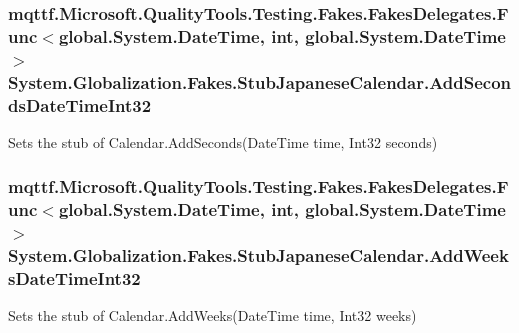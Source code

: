 \hypertarget{class_system_1_1_globalization_1_1_fakes_1_1_stub_japanese_calendar_a5edfae7addd7ca45d48e33fa68c578d3}{
\subsubsection[{Add\-Seconds\-Date\-Time\-Int32}]{\setlength{\rightskip}{0pt plus 5cm}mqttf.\-Microsoft.\-Quality\-Tools.\-Testing.\-Fakes.\-Fakes\-Delegates.\-Func$<$global.\-System.\-Date\-Time, int, global.\-System.\-Date\-Time$>$ System.\-Globalization.\-Fakes.\-Stub\-Japanese\-Calendar.\-Add\-Seconds\-Date\-Time\-Int32}}\label{class_system_1_1_globalization_1_1_fakes_1_1_stub_japanese_calendar_a5edfae7addd7ca45d48e33fa68c578d3}


Sets the stub of Calendar.\-Add\-Seconds(\-Date\-Time time, Int32 seconds)

\hypertarget{class_system_1_1_globalization_1_1_fakes_1_1_stub_japanese_calendar_a0d8e337709c0be8e71f33cdeefef5d23}{
\subsubsection[{Add\-Weeks\-Date\-Time\-Int32}]{\setlength{\rightskip}{0pt plus 5cm}mqttf.\-Microsoft.\-Quality\-Tools.\-Testing.\-Fakes.\-Fakes\-Delegates.\-Func$<$global.\-System.\-Date\-Time, int, global.\-System.\-Date\-Time$>$ System.\-Globalization.\-Fakes.\-Stub\-Japanese\-Calendar.\-Add\-Weeks\-Date\-Time\-Int32}}\label{class_system_1_1_globalization_1_1_fakes_1_1_stub_japanese_calendar_a0d8e337709c0be8e71f33cdeefef5d23}


Sets the stub of Calendar.\-Add\-Weeks(\-Date\-Time time, Int32 weeks)

